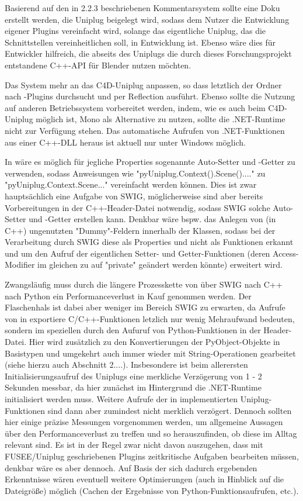 Basierend auf den in 2.2.3 beschriebenen Kommentarsystem sollte eine Doku erstellt werden, die Uniplug beigelegt wird, sodass dem Nutzer die Entwicklung eigener Plugins vereinfacht wird, solange das eigentliche Uniplug, das die Schnittstellen vereinheitlichen soll, in Entwicklung ist. Ebenso wäre dies für Entwickler hilfreich, die abseits des Uniplugs die durch dieses Forschungsprojekt entstandene C++-API für Blender nutzen möchten.

Das System mehr an das C4D-Uniplug anpassen, so dass letztlich der Ordner nach \CS{}-Plugins durchsucht und per Reflection ausführt. Ebenso sollte die Nutzung auf anderen Betriebssystem vorbereitet werden, indem, wie es auch beim C4D-Uniplug möglich ist, Mono als Alternative zu nutzen, sollte die .NET-Runtime nicht zur Verfügung stehen. Das automatische Aufrufen von .NET-Funktionen aus einer C++-DLL heraus ist aktuell nur unter Windows möglich.

In \CS{} wäre es möglich für jegliche Properties sogenannte Auto-Setter und -Getter zu verwenden, sodass Anweisungen wie "pyUniplug.Context().Scene()...." zu "pyUniplug.Context.Scene..." vereinfacht werden können. Dies ist zwar hauptsächlich eine Aufgabe von SWIG, möglicherweise sind aber bereits Vorbereitungen in der C++-Header-Datei notwendig, sodass SWIG solche Auto-Setter und -Getter erstellen kann. Denkbar wäre bspw. das Anlegen von (in C++) ungenutzten "Dummy"-Feldern innerhalb der Klassen, sodass bei der Verarbeitung durch SWIG diese als Properties und nicht als Funktionen erkannt und um den Aufruf der eigentlichen Setter- und Getter-Funktionen (deren Access-Modifier im gleichen zu auf "private" geändert werden könnte) erweitert wird.

Zwangsläufig muss durch die längere Prozesskette von \CS{} über SWIG nach C++ nach Python ein Performanceverlust in Kauf genommen werden. Der Flaschenhals ist dabei aber weniger im Bereich SWIG zu erwarten, da Aufrufe von \CS{} in exportiere C/C++-Funktionen letzlich nur wenig Mehraufwand bedeuten, sondern im speziellen durch den Aufuruf von Python-Funktionen in der Header-Datei. Hier wird zusätzlich zu den Konvertierungen der PyObject-Objekte in Basistypen und umgekehrt auch immer wieder mit String-Operationen gearbeitet (siehe hierzu auch Abschnitt 2....). Insbesondere ist beim allerersten Initialisierungsaufruf des Uniplugs eine merkliche Verzögerung von 1 - 2 Sekunden messbar, da hier zunächst im Hintergrund die .NET-Runtime initialisiert werden muss. Weitere Aufrufe der in \CS{} implementierten Uniplug-Funktionen sind dann aber zumindest nicht merklich verzögert. Dennoch sollten hier einige präzise Messungen vorgenommen werden, um allgemeine Aussagen über den Performanceverlust zu treffen und so herauszufinden, ob diese im Alltag relevant sind. Es ist in der Regel zwar nicht davon auszugehen, dass mit FUSEE/Uniplug geschriebenen Plugins zeitkritische Aufgaben bearbeiten müssen, denkbar wäre es aber dennoch.  Auf Basis der sich dadurch ergebenden Erkenntnisse wären eventuell weitere Optimierungen (auch in Hinblick auf die Dateigröße) möglich (Cachen der Ergebnisse von Python-Funktionsaufrufen, etc.).
